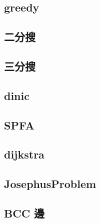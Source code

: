     \subsection{greedy}
         \columnbreak
    
    \subsection{二分搜}
        
    \subsection{三分搜}
         \columnbreak
    \subsection{dinic}
         \columnbreak
    \subsection{SPFA}
        
    \subsection{dijkstra}
        
    \subsection{JosephusProblem}
        
    \subsection{BCC 邊}
        
